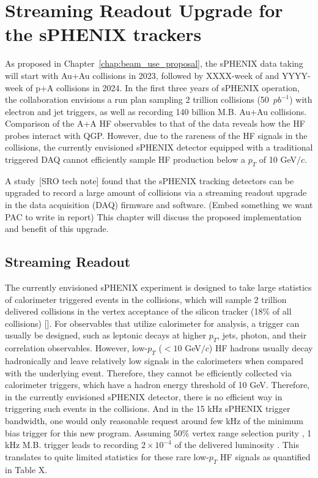 
\section{Streaming Readout Upgrade for the sPHENIX trackers}
 
As proposed in Chapter~\ref{chap:beam_use_proposal}, the sPHENIX data taking will start with Au+Au collisions in 2023, followed by XXXX-week of \pp and YYYY-week of p+A collisions in 2024.  In the first three years of sPHENIX operation, the collaboration envisions a run plan sampling 2 trillion \pp collisions (50~$pb^{-1}$)  with electron and jet triggers, as well as recording 140 billion M.B. Au+Au collisions. Comparison of the A+A HF observables to that of the \pp data reveals how the HF probes interact with QGP. However, due to the rareness of the HF signals in the \pp collisions, the currently envisioned sPHENIX detector equipped with a traditional triggered  DAQ cannot efficiently sample HF production below a $p_T$ of 10 GeV$/c$. 
 
A study~[SRO tech note] found that the sPHENIX tracking detectors can be upgraded to record a large amount of \pp collisions via a streaming readout upgrade in the data acquisition (DAQ) firmware and software. 
(Embed something we want PAC to write in report) 
This chapter will discuss the proposed implementation and benefit of this upgrade. 
 

\subsection{Streaming Readout}
 
 The currently envisioned sPHENIX experiment is designed to take large statistics of calorimeter triggered events in the \pp collisions, which will sample 2 trillion delivered \pp collisions in the vertex acceptance of the silicon tracker (18\% of all collisions) []. For observables that utilize calorimeter for analysis, a trigger can usually be designed, such as leptonic decays at higher $p_T$, jets, photon, and their correlation observables. However, low-$p_T$  ($<10$ GeV$/c$) HF hadrons usually decay hadronically and leave relatively low signals in the calorimeters when compared with the underlying event. Therefore, they cannot be efficiently collected via calorimeter triggers, which have a hadron energy threshold of 10 GeV. Therefore, in the currently envisioned sPHENIX detector, there is no efficient way in triggering such events in the \pp collisions. And in the 15 kHz sPHENIX trigger bandwidth, one would only reasonable request around few kHz of the minimum bias \pp trigger for this new program. Assuming 50\% vertex range selection purity , 1 kHz M.B. trigger leads to recording $2\times10^{-4}$ of the delivered luminosity . This translates to quite limited statistics for these rare low-$p_T$ HF signals as quantified in Table X.
 
